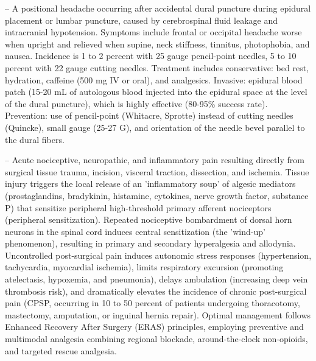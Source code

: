 -- A positional headache occurring after accidental dural puncture during epidural placement or lumbar puncture, caused by cerebrospinal fluid leakage and intracranial hypotension. Symptoms include frontal or occipital headache worse when upright and relieved when supine, neck stiffness, tinnitus, photophobia, and nausea. Incidence is 1 to 2 percent with 25 gauge pencil-point needles, 5 to 10 percent with 22 gauge cutting needles. Treatment includes conservative: bed rest, hydration, caffeine (500 mg IV or oral), and analgesics. Invasive: epidural blood patch (15-20 mL of autologous blood injected into the epidural space at the level of the dural puncture), which is highly effective (80-95\% success rate). Prevention: use of pencil-point (Whitacre, Sprotte) instead of cutting needles (Quincke), small gauge (25-27 G), and orientation of the needle bevel parallel to the dural fibers.

-- Acute nociceptive, neuropathic, and inflammatory pain resulting directly from surgical tissue trauma, incision, visceral traction, dissection, and ischemia. Tissue injury triggers the local release of an 'inflammatory soup' of algesic mediators (prostaglandins, bradykinin, histamine, cytokines, nerve growth factor, substance P) that sensitize peripheral high-threshold primary afferent nociceptors (peripheral sensitization). Repeated nociceptive bombardment of dorsal horn neurons in the spinal cord induces central sensitization (the 'wind-up' phenomenon), resulting in primary and secondary hyperalgesia and allodynia. Uncontrolled post-surgical pain induces autonomic stress responses (hypertension, tachycardia, myocardial ischemia), limits respiratory excursion (promoting atelectasis, hypoxemia, and pneumonia), delays ambulation (increasing deep vein thrombosis risk), and dramatically elevates the incidence of chronic post-surgical pain (CPSP, occurring in 10 to 50 percent of patients undergoing thoracotomy, mastectomy, amputation, or inguinal hernia repair). Optimal management follows Enhanced Recovery After Surgery (ERAS) principles, employing preventive and multimodal analgesia combining regional blockade, around-the-clock non-opioids, and targeted rescue analgesia.

